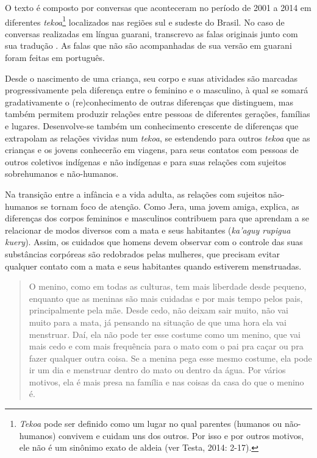 O texto é composto por conversas que aconteceram no período de 2001 a
2014 em diferentes \emph{tekoa}\footnote{\emph{Tekoa} pode ser definido como um lugar
no qual parentes (humanos ou não-humanos) convivem e cuidam uns dos
outros. Por isso e por outros motivos, ele não é um sinônimo exato de
aldeia (ver Testa, 2014: 2-17).} localizados nas regiões sul e
sudeste do Brasil. No caso de conversas realizadas em língua guarani,
transcrevo as falas originais junto com sua tradução\footnotemark
{}. As falas que não são acompanhadas
de sua versão em guarani foram feitas em português.

Desde o nascimento de uma criança, seu corpo e suas atividades são
marcadas progressivamente pela diferença entre o feminino e o
masculino, à qual se somará gradativamente o (re)conhecimento de outras
diferenças que distinguem, mas também permitem produzir relações entre
pessoas de diferentes gerações, famílias e lugares. Desenvolve-se
também um conhecimento crescente de diferenças que extrapolam as
relações vividas num \emph{tekoa}, se estendendo para outros \emph{tekoa} que as
crianças e os jovens conhecerão em viagens, para seus contatos com
pessoas de outros coletivos indígenas e não indígenas e para suas
relações com sujeitos sobrehumanos e não-humanos. 

Na transição entre a infância e a vida adulta, as relações com sujeitos
não-humanos se tornam foco de atenção. Como Jera, uma jovem amiga,
explica, as diferenças dos corpos femininos e masculinos contribuem
para que aprendam a se relacionar de modos diversos com a mata e seus
habitantes (\emph{ka’aguy rupigua kuery}). Assim, os cuidados que homens devem
observar com o controle das suas substâncias corpóreas são redobrados
pelas mulheres, que precisam evitar qualquer contato com a mata e seus
habitantes quando estiverem menstruadas. 

\begin{quotation}
O menino, como em todas as culturas, tem mais liberdade desde pequeno,
enquanto que as meninas são mais cuidadas e por mais tempo pelos pais,
principalmente pela mãe. Desde cedo, não deixam sair muito, não vai
muito para a mata, já pensando na situação de que uma hora ela vai
menstruar. Daí, ela não pode ter esse costume como um menino, que vai
mais cedo e com mais frequência para o mato com o pai pra caçar ou pra
fazer qualquer outra coisa. Se a menina pega esse mesmo costume, ela
pode ir um dia e menstruar dentro do mato ou dentro da água. Por vários
motivos, ela é mais presa na família e nas coisas da casa do que o
menino é.
\end{quotation}

